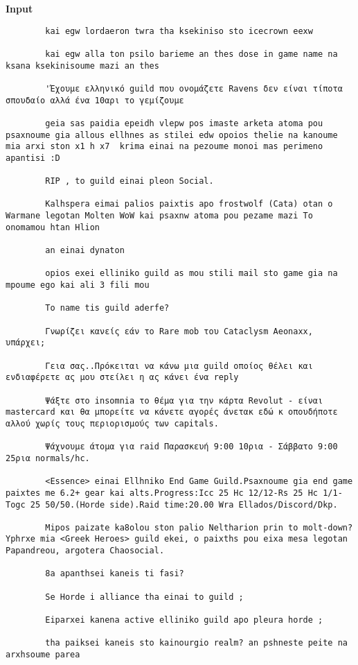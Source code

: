 \documentclass[11pt, a4paper]{article}
\begin{document}
	\textbf{Input}
	\begin{verbatim}
		kai egw lordaeron twra tha ksekiniso sto icecrown eexw
		
		kai egw alla ton psilo barieme an thes dose in game name na ksana ksekinisoume mazi an thes
		
		'Έχουμε ελληνικό guild που ονομάζετε Ravens δεν είναι τίποτα σπουδαίο αλλά ένα 10αρι το γεμίζουμε 
		
		geia sas paidia epeidh vlepw pos imaste arketa atoma pou psaxnoume gia allous ellhnes as stilei edw opoios thelie na kanoume mia arxi ston x1 h x7  krima einai na pezoume monoi mas perimeno apantisi :D
		
		RIP , to guild einai pleon Social.
		
		Kalhspera eimai palios paixtis apo frostwolf (Cata) otan o Warmane legotan Molten WoW kai psaxnw atoma pou pezame mazi To onomamou htan Hlion
		
		an einai dynaton
		
		opios exei elliniko guild as mou stili mail sto game gia na mpoume ego kai ali 3 fili mou 
		
		To name tis guild aderfe?
		
		Γνωρίζει κανείς εάν το Rare mob του Cataclysm Αeonaxx, υπάρχει;
		
		Γεια σας..Πρόκειται να κάνω μια guild οποίος θέλει και ενδιαφέρετε ας μου στείλει η ας κάνει ένα reply
		
		Ψάξτε στο insomnia το θέμα για την κάρτα Revolut - είναι mastercard και θα μπορείτε να κάνετε αγορές άνετακ εδώ κ οπουδήποτε αλλού χωρίς τους περιορισμούς των capitals.
		
		Ψάχνουμε άτομα για raid Παρασκευή 9:00 10ρια - Σάββατο 9:00 25ρια normals/hc.
		
		<Essence> einai Ellhniko End Game Guild.Psaxnoume gia end game paixtes me 6.2+ gear kai alts.Progress:Icc 25 Hc 12/12-Rs 25 Hc 1/1-Togc 25 50/50.(Horde side).Raid time:20.00 Wra Ellados/Discord/Dkp.
		
		Mipos paizate ka8olou ston palio Neltharion prin to molt-down? Yphrxe mia <Greek Heroes> guild ekei, o paixths pou eixa mesa legotan Papandreou, argotera Chaosocial.
		
		8a apanthsei kaneis ti fasi?
		
		Se Horde i alliance tha einai to guild ;
		
		Eiparxei kanena active elliniko guild apo pleura horde ;
		
		tha paiksei kaneis sto kainourgio realm? an pshneste peite na arxhsoume parea 
		
	\end{verbatim}
\end{document}
